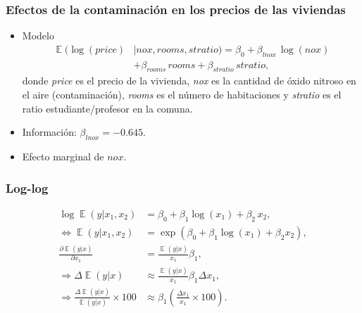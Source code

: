 \documentclass[t, compress, spanish, aspectratio=169]{beamer}
\DeclareMathOperator{\E}{\mathbb{E}}
\begin{document}
    \begin{frame}
        \frametitle{Efectos de la contaminaci\'on en los precios de las viviendas}
        \begin{itemize}
            \item Modelo
            \begin{align*}
            		\E(\log(price)&|nox, rooms, stratio) = \beta_0 +\beta_{lnox} \,\log(nox) \\
            		&+\beta_{rooms}\, rooms + \beta_{stratio} \,stratio,
            \end{align*}
            donde \emph{price} es el precio de la vivienda, \emph{nox} es la cantidad de \'oxido nitroso en el aire (contaminaci\'on), \emph{rooms} es el n\'umero de habitaciones y \emph{stratio} es el ratio estudiante/profesor en la comuna.
            \item Informaci\'on: $\beta_{lnox}=-0.645$.
            \item Efecto marginal de $nox$.
        \end{itemize}
    \end{frame}
%    
    
        
    \begin{frame}
        \frametitle{Log-log}
            \begin{align*}
\log \E(y|x_{1},x_{2})&=\beta_0 + \beta_1 \log(x_{1})+\beta_2 \,x_{2},\\
\iff
            \E(y|x_{1},x_{2})&=\exp(\beta_0 + \beta_1 \log(x_{1})+\beta_2 x_{2}), \\
            \frac{\partial \E(y|x)}{\partial x_1} & = \frac{\E(y|x)}{x_1}\beta_1,\\
            \Rightarrow \Delta \E(y|x) &\approx \frac{\E(y|x)}{x_1}\beta_1 \Delta x_1 ,\\
            \Rightarrow \frac{\Delta \E(y|x)}{\E(y|x)} \times 100&\approx \beta_1 \left(\frac{\Delta x_1}{x_1} \times 100\right).
            \end{align*}
    \end{frame}
\end{document}
